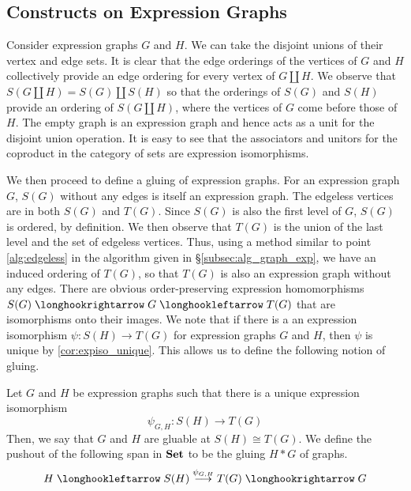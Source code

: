 
\subsection{Constructs on Expression Graphs}

Consider expression graphs $G$ and $H$. We can take the disjoint unions of their
vertex and edge sets. It is clear that the edge orderings of the vertices of
$G$ and $H$ collectively provide an edge ordering for every vertex of
$G \amalg H$. We observe that $S(G \amalg H) = S(G) \amalg S(H)$ so that the
orderings of $S(G)$ and $S(H)$ provide an ordering of $S(G \amalg H)$, where the
vertices of $G$ come before those of $H$. The empty graph is an expression graph
and hence acts as a unit for the disjoint union operation. It is easy to see
that the associators and unitors for the coproduct in the category of sets are
expression isomorphisms.

We then proceed to define a gluing of expression graphs. For an expression
graph $G$, $S(G)$ without any edges is itself an expression graph.
The edgeless vertices are in both $S(G)$ and $T(G)$. Since $S(G)$ is also the
first level of $G$, $S(G)$ is ordered, by definition. We then observe that
$T(G)$ is the union of the last level and the set of edgeless vertices. Thus,
using a method similar to point \ref{alg:edgeless} in the algorithm given in
\S\ref{subsec:alg_graph_exp}, we have an induced ordering of $T(G)$, so that
$T(G)$ is also an expression graph without any edges.
There are obvious order-preserving expression homomorphisms
$S(G) \hto G \hot T(G)$ that are isomorphisms onto their images. We note
that if there is a an expression isomorphism $\psi : S(H) \to T(G)$ for
expression graphs $G$ and $H$, then $\psi$ is unique by \ref{cor:expiso_unique}.
This allows us to define the following notion of gluing.

\begin{defn}
Let $G$ and $H$ be expression graphs such that there is a unique expression
isomorphism
\[
  \psi_{G, H} : S(H) \to T(G)
\]
Then, we say that $G$ and $H$ are gluable at $S(H) \cong T(G)$. We define the
pushout of the following span in $\textbf{Set}$ to be the gluing $H * G$ of graphs.
\[
  H \hot S(H) \to[\psi_{G, H}] T(G) \hto G
\]
\end{defn}


